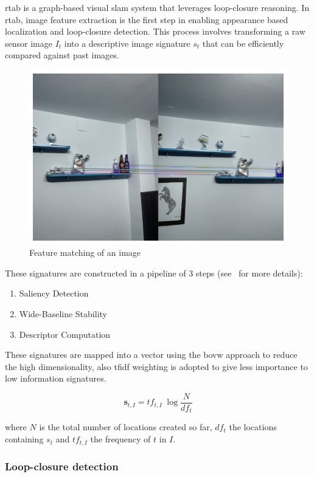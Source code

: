 \gls{rtab} is a graph-based visual \gls{slam} system that leverages loop-closure reasoning.
In \gls{rtab}, image feature extraction is the first step in enabling appearance based localization and loop-closure detection. This process involves transforming a raw sensor image $I_t$ into a descriptive image signature $s_t$ that can be efficiently compared against past images.

\begin{figure}[H]
  \centering
  \includegraphics[width=0.5\linewidth]{imgs/image_feature_extraction.png}
  \caption{Feature matching of an image}
  \label{fig:feature_extraction}
\end{figure}

\MakeUppercase{t}hese signatures are constructed in a pipeline of 3 steps (see~\cite{1570189} for more details):

\begin{enumerate}
  \item Saliency Detection
  \item Wide-Baseline Stability
  \item Descriptor Computation
\end{enumerate}

\MakeUppercase{t}hese signatures are mapped into a vector using the \gls{bovw} approach to reduce the high dimensionality, also \gls{tfidf} weighting is adopted to give less importance to low information signatures.

\begin{equation}
  \mathbf{s}_{t,I}=tf_{t,I}\;\log\frac{N}{df_t} \label{eq:tfidf}
\end{equation}

where $N$ is the total number of locations created so far, $df_t$ the locations containing $s_t$ and $tf_{t,I}$ the frequency of $t$ in $I$.

\subsubsection*{Loop-closure detection}

